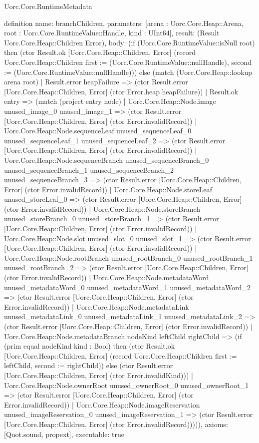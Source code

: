 \begin{lexlean}{Uorc.Core.RuntimeMetadata}
\begin{semanticmodule}
definition{
  name: branchChildren,
  parameters: [arena : Uorc.Core.Heap::Arena, root : Uorc.Core.RuntimeValue::Handle, kind : UInt64],
  result: (Result Uorc.Core.Heap::Children Error),
  body: (if (Uorc.Core.RuntimeValue::isNull root) then (ctor Result.ok [Uorc.Core.Heap::Children, Error] (record Uorc.Core.Heap::Children {first := (Uorc.Core.RuntimeValue::nullHandle), second := (Uorc.Core.RuntimeValue::nullHandle)})) else (match (Uorc.Core.Heap::lookup arena root)
    | Result.error heapFailure => (ctor Result.error [Uorc.Core.Heap::Children, Error] (ctor Error.heap heapFailure))
    | Result.ok entry => (match (project entry node)
      | Uorc.Core.Heap::Node.image unused_image_0 unused_image_1 => (ctor Result.error [Uorc.Core.Heap::Children, Error] (ctor Error.invalidRecord))
      | Uorc.Core.Heap::Node.sequenceLeaf unused_sequenceLeaf_0 unused_sequenceLeaf_1 unused_sequenceLeaf_2 => (ctor Result.error [Uorc.Core.Heap::Children, Error] (ctor Error.invalidRecord))
      | Uorc.Core.Heap::Node.sequenceBranch unused_sequenceBranch_0 unused_sequenceBranch_1 unused_sequenceBranch_2 unused_sequenceBranch_3 => (ctor Result.error [Uorc.Core.Heap::Children, Error] (ctor Error.invalidRecord))
      | Uorc.Core.Heap::Node.storeLeaf unused_storeLeaf_0 => (ctor Result.error [Uorc.Core.Heap::Children, Error] (ctor Error.invalidRecord))
      | Uorc.Core.Heap::Node.storeBranch unused_storeBranch_0 unused_storeBranch_1 => (ctor Result.error [Uorc.Core.Heap::Children, Error] (ctor Error.invalidRecord))
      | Uorc.Core.Heap::Node.slot unused_slot_0 unused_slot_1 => (ctor Result.error [Uorc.Core.Heap::Children, Error] (ctor Error.invalidRecord))
      | Uorc.Core.Heap::Node.rootBranch unused_rootBranch_0 unused_rootBranch_1 unused_rootBranch_2 => (ctor Result.error [Uorc.Core.Heap::Children, Error] (ctor Error.invalidRecord))
      | Uorc.Core.Heap::Node.metadataWord unused_metadataWord_0 unused_metadataWord_1 unused_metadataWord_2 => (ctor Result.error [Uorc.Core.Heap::Children, Error] (ctor Error.invalidRecord))
      | Uorc.Core.Heap::Node.metadataLink unused_metadataLink_0 unused_metadataLink_1 unused_metadataLink_2 => (ctor Result.error [Uorc.Core.Heap::Children, Error] (ctor Error.invalidRecord))
      | Uorc.Core.Heap::Node.metadataBranch nodeKind leftChild rightChild => (if (prim equal nodeKind kind : Bool) then (ctor Result.ok [Uorc.Core.Heap::Children, Error] (record Uorc.Core.Heap::Children {first := leftChild, second := rightChild})) else (ctor Result.error [Uorc.Core.Heap::Children, Error] (ctor Error.invalidKind)))
      | Uorc.Core.Heap::Node.ownerRoot unused_ownerRoot_0 unused_ownerRoot_1 => (ctor Result.error [Uorc.Core.Heap::Children, Error] (ctor Error.invalidRecord))
      | Uorc.Core.Heap::Node.imageReservation unused_imageReservation_0 unused_imageReservation_1 => (ctor Result.error [Uorc.Core.Heap::Children, Error] (ctor Error.invalidRecord))))),
  axioms: [Quot.sound, propext],
  executable: true
}


\end{semanticmodule}
\end{lexlean}

